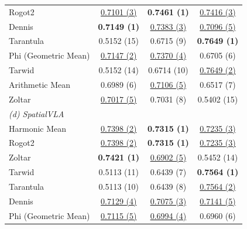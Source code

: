 \begin{table}[t]
{\begin{tabular}{lccc}
Rogot2 & \underline{0.7101 (3)} & \textbf{0.7461 (1)} & \underline{0.7416 (3)} \\
Dennis & \textbf{0.7149 (1)} & \underline{0.7383 (3)} & \underline{0.7096 (5)} \\
Tarantula & 0.5152 (15) & 0.6715 (9) & \textbf{0.7649 (1)} \\
Phi (Geometric Mean) & \underline{0.7147 (2)} & \underline{0.7370 (4)} & 0.6705 (6) \\
Tarwid & 0.5152 (14) & 0.6714 (10) & \underline{0.7649 (2)} \\
Arithmetic Mean & 0.6989 (6) & \underline{0.7106 (5)} & 0.6517 (7) \\
Zoltar & \underline{0.7017 (5)} & 0.7031 (8) & 0.5402 (15) \\
\midrule
\multicolumn{4}{l}{\textit{(d) SpatialVLA}} \\
Harmonic Mean & \underline{0.7398 (2)} & \textbf{0.7315 (1)} & \underline{0.7235 (3)} \\
Rogot2 & \underline{0.7398 (2)} & \textbf{0.7315 (1)} & \underline{0.7235 (3)} \\
Zoltar & \textbf{0.7421 (1)} & \underline{0.6902 (5)} & 0.5452 (14) \\
Tarwid & 0.5113 (11) & 0.6439 (7) & \textbf{0.7564 (1)} \\
Tarantula & 0.5113 (10) & 0.6439 (8) & \underline{0.7564 (2)} \\
Dennis & \underline{0.7129 (4)} & \underline{0.7075 (3)} & \underline{0.7141 (5)} \\
Phi (Geometric Mean) & \underline{0.7115 (5)} & \underline{0.6994 (4)} & 0.6960 (6) \\
\bottomrule
\end{tabular}
}
\end{table}
